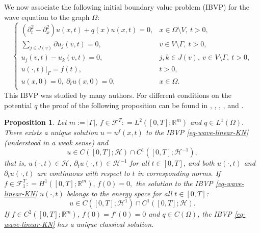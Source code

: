 \documentclass[11pt]{amsart}
\theoremstyle{definition}
\theoremstyle{plain}
\newtheorem{proposition}[definition]{Proposition}
\numberwithin{equation}{section}
\begin{document}
 We now associate the following initial boundary value problem (IBVP) for the wave equation to the graph $\Omega$: 
 \begin{equation}\label{eq-wave-linear-KN}
    \begin{cases}
    (\partial_{t}^2 -\partial_x^2 ) u(x,t)+q(x) u(x,t)=0, &x\in \Omega \setminus V, \  t > 0,\\
    \sum_{j \in J(v)}  \partial u_j(v,t)=  0, & v \in V \setminus \Gamma, \ t > 0, \\ 
    u_j(v,t)-u_k(v,t)=0, &  j,k \in J(v), \ v \in V \setminus \Gamma, \  t > 0, \\
    u(\cdot,t)|_{\Gamma}=f(t), &  t > 0,\\
          u(x,0) = 0, \ 
      \partial_t u(x,0) = 0, &x\in \Omega.\\
    \end{cases}
\end{equation}
 This IBVP was studied by many authors.   
For different conditions on the potential $q$ 
the proof of the following proposition can be found in  \cite{mehmeti1994nonlinear}, \cite{lagnese1994analysis}, \cite{dager2006wave}, \cite{avdonin2015source},
and \cite{AZ}. 
\begin{proposition} \label{prop:unispace} 
	Let $m:=|\Gamma|, \, {f} \in \mathcal{F}^T: = L^2([0,T]; \mathbb{R}^m)$ and
	 $q \in L^1(\Omega).$ There exists a unique solution $	u =u^f(x,t)$ to the IBVP \eqref{eq-wave-linear-KN} (understood in a weak sense)  and
		\begin{equation} \label{inclusion}
u \in C([0,T]; \mathcal{H}) \cap C^1([0,T]; \mathcal{H}^{-1}),
	\end{equation}
		\noindent that is, $u(\cdot, t) \in \mathcal{H}$, $\partial_t u(\cdot, t) \in \mathcal{H}^{-1}$ for all $t \in [0,T]$, and both $u(\cdot, t)$ and $\partial_t u(\cdot, t)$ are continuous with respect to $t$ in  corresponding norms.
  If $f \in \mathcal{F}^T_1: = H^1([0,T]; \mathbb{R}^m), \, f(0)=0,$ the solution to the IBVP \eqref{eq-wave-linear-KN} $u(\cdot,t)$ belongs to the energy space for all $t \in [0,T]$: 
  \begin{equation} \label{energy}
u \in C([0,T]; \mathcal{H}^1) \cap C^1([0,T]; \mathcal{H}).
	\end{equation}
  If ${f} \in C^2([0,T]; \mathbb{R}^m)$, ${f}(0)={f}'(0)={0}$ and $q \in C(\Omega)$, the IBVP \eqref{eq-wave-linear-KN} has a unique classical solution. 
\end{proposition}
\end{document}

